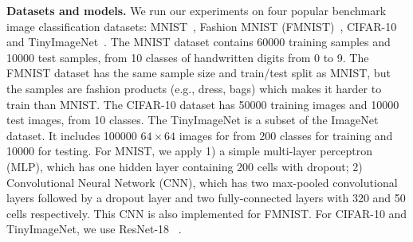 \documentclass[nohyperref]{article}
\begin{document}
\vspace{0.1in}
\noindent\textbf{Datasets and models.} We run our experiments on four popular benchmark image classification datasets: MNIST~\citep{lecun1998mnist}, Fashion MNIST (FMNIST)~\citep{xiao2017fashion}, CIFAR-10~\citep{krizhevsky2009learning} and TinyImageNet~\citep{deng2009imagenet}. The MNIST dataset contains 60000 training samples and 10000 test samples, from 10 classes of handwritten digits from 0 to 9. The FMNIST dataset has the same sample size and train/test split as MNIST, but the samples are fashion products (e.g., dress, bags) which makes it harder to train than MNIST. The CIFAR-10 dataset has 50000 training images and 10000 test images, from 10 classes. The TinyImageNet is a subset of the ImageNet dataset. It includes 100000 $64\times 64$ images for from 200 classes for training and 10000 for testing. For MNIST, we apply 1) a simple multi-layer perceptron (MLP), which has one hidden layer containing 200 cells with dropout; 2) Convolutional Neural Network (CNN), which has two max-pooled convolutional layers followed by a dropout layer and two fully-connected layers with 320 and 50 cells respectively. This CNN is also implemented for FMNIST. 
For CIFAR-10 and TinyImageNet, we use ResNet-18 ~\cite{Proc:He-resnet16}.
\end{document}
